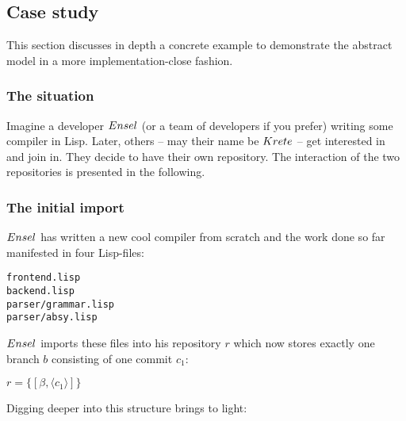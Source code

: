\documentclass[fleqn, 10pt, a4paper]{report}
\begin{document}
\subsection{Case study}

This section discusses in depth a concrete example to demonstrate the
abstract model in a more implementation-close fashion.

\subsubsection{The situation}

Imagine a developer $\mathnormal{Ensel}$ (or a team of developers
if you prefer) writing
some compiler in Lisp. Later, others --
may their name be $\mathnormal{Krete}$ -- get interested in and join in.
They decide to have their own repository. The interaction of the two
repositories is presented in the following.

\subsubsection{The initial import}

$\mathnormal{Ensel}$ has written a new cool compiler from scratch
and the work done so far manifested in four Lisp-files:

\begin{verbatim}
frontend.lisp
backend.lisp
parser/grammar.lisp
parser/absy.lisp
\end{verbatim}

$\mathnormal{Ensel}$ imports these files into his repository $r$ which
now stores exactly one branch $b$ consisting of one commit $c_1$:

$r=\{[\beta, \langle c_1\rangle]\}$

Digging deeper into this structure brings to light:
\end{document}
